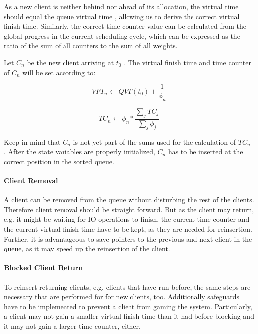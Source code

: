 As a new client is neither behind nor ahead of its allocation, the virtual time should equal
the queue virtual time , allowing us to derive the correct virtual finish time.
Similarly, the correct time counter value can be calculated from the global progress in the
current scheduling cycle, which can be expressed as the ratio of the sum of all counters to
the sum of all weights.

Let $C_n$ be the new client arriving at $t_0$ . The virtual finish time and time counter of $C_n$ will
be set according to:

\begin{equation}
  VFT_{n} \leftarrow QVT(t_0) + \frac{1}{\phi_n}
\end{equation}                             

\begin{equation}
  TC_n \leftarrow \phi_n*\frac{\sum_jTC_j}{\sum_j\phi_j}
\end{equation}                             

Keep in mind that $C_n$ is not yet part of the sums used for the calculation of $TC_n$ . After
the state variables are properly initialized, $C_n$ has to be inserted at the correct position in
the sorted queue.

\paragraph{Client Removal}

A client can be removed from the queue without disturbing the rest of the clients.
Therefore client removal should be straight forward. But as the client may return, e.g. it might
be waiting for IO operations to finish, the current time counter and the current virtual finish
time have to be kept, as they are needed for reinsertion. Further, it is advantageous to save
pointers to the previous and next client in the queue, as it may speed up the reinsertion of
the client.

\paragraph{Blocked Client Return}

To reinsert returning clients, e.g. clients that have run before, the same steps are necessary
that are performed for for new clients, too. Additionally safeguards have to be 
implemented to prevent a client from gaming the system. Particularly, a client may not gain a
smaller virtual finish time than it had before blocking and it may not gain a larger time
counter, either.

